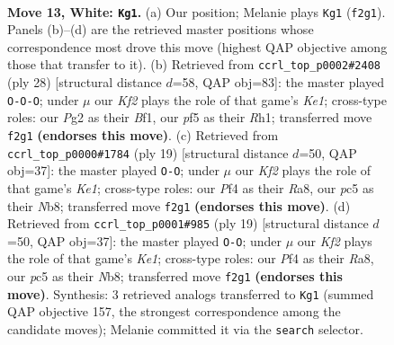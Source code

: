 \documentclass[11pt]{article}
\begin{document}
\clearpage

\begin{figure}[p]\centering
\begin{subfigure}{0.46\textwidth}\centering
\resizebox{\linewidth}{!}{%
\newchessgame
\chessboard[
  setfen={r1b1kbnr/p3q1p1/8/2ppPp1p/5P2/1P6/P3QKPP/RNB2B1R w kq - 0 13},
  showmover=false,
  pgfstyle=straightmove, color=movearrow, markmove={f2-g1}
]}
\caption{}
\end{subfigure}\hfill
\begin{subfigure}{0.46\textwidth}\centering
\resizebox{\linewidth}{!}{%
\newchessgame
\chessboard[
  setfen={r3kb1r/ppp1qpp1/8/4Pb1p/2P5/4Q2P/PP1N1PP1/R3KB1R w KQkq - 1 15},
  showmover=false,
  pgfstyle=straightmove, color=movearrow, markmove={e1-c1}
]}
\caption{}
\end{subfigure}
\\[4pt]
\begin{subfigure}{0.46\textwidth}\centering
\resizebox{\linewidth}{!}{%
\newchessgame
\chessboard[
  setfen={rnbqk2r/pp2bppp/3p4/1N1Pp3/P7/8/1PP1BPPP/R1BQK2R b KQkq - 2 10},
  showmover=false,
  pgfstyle=straightmove, color=movearrow, markmove={e8-g8}
]}
\caption{}
\end{subfigure}\hfill
\begin{subfigure}{0.46\textwidth}\centering
\resizebox{\linewidth}{!}{%
\newchessgame
\chessboard[
  setfen={rnbqk2r/pp2bppp/3p4/1N1Pp3/P7/8/1PP1BPPP/R1BQK2R b KQkq - 2 10},
  showmover=false,
  pgfstyle=straightmove, color=movearrow, markmove={e8-g8}
]}
\caption{}
\end{subfigure}
\caption{\textbf{Move 13, White: \texttt{Kg1}.} (a) Our position; Melanie plays \texttt{Kg1} (\texttt{f2g1}). Panels (b)--(d) are the retrieved master positions whose correspondence most drove this move (highest QAP objective among those that transfer to it). (b) Retrieved from \texttt{ccrl\_top\_p0002\#2408} (ply 28) [structural distance $d$=58, QAP obj=83]: the master played \texttt{O-O-O}; under $\mu$ our \emph{Kf2} plays the role of that game's \emph{Ke1}; cross-type roles: our \emph{P}g2 as their \emph{B}f1, our \emph{p}f5 as their \emph{R}h1; transferred move \texttt{f2g1} \textbf{(endorses this move)}. (c) Retrieved from \texttt{ccrl\_top\_p0000\#1784} (ply 19) [structural distance $d$=50, QAP obj=37]: the master played \texttt{O-O}; under $\mu$ our \emph{Kf2} plays the role of that game's \emph{Ke1}; cross-type roles: our \emph{P}f4 as their \emph{R}a8, our \emph{p}c5 as their \emph{N}b8; transferred move \texttt{f2g1} \textbf{(endorses this move)}. (d) Retrieved from \texttt{ccrl\_top\_p0001\#985} (ply 19) [structural distance $d$=50, QAP obj=37]: the master played \texttt{O-O}; under $\mu$ our \emph{Kf2} plays the role of that game's \emph{Ke1}; cross-type roles: our \emph{P}f4 as their \emph{R}a8, our \emph{p}c5 as their \emph{N}b8; transferred move \texttt{f2g1} \textbf{(endorses this move)}. Synthesis: 3 retrieved analogs transferred to \texttt{Kg1} (summed QAP objective 157, the strongest correspondence among the candidate moves); Melanie committed it via the \texttt{search} selector.}
\label{fig:thought-m24}
\end{figure}
\end{document}
